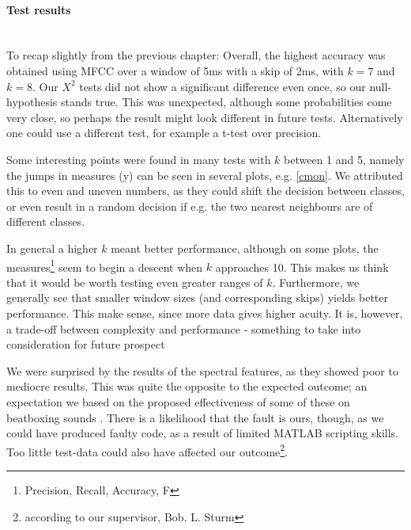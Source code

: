 \paragraph{Test results} \hspace{0pt} \\
To recap slightly from the previous chapter: Overall, the highest accuracy was obtained using MFCC over a window of 5ms with a skip of 2ms, with $k=7$ and $k=8$. Our $X^2$ tests did not show a significant difference even once, so our null-hypothesis stands true. This was unexpected, although some probabilities come very close, so perhaps the result might look different in future tests. Alternatively one could use a different test, for example a t-test over precision.

Some interesting points were found in many tests with $k$ between 1 and 5, namely the jumps in measures (y) can be seen in several plots, e.g. \ref{cmon}. We attributed this to even and uneven numbers, as they could shift the decision between classes, or even result in a random decision if e.g. the two nearest neighbours are of different classes.

In general a higher $k$ meant better performance, although on some plots, the measures\footnote{Precision, Recall, Accuracy, F} seem to begin a descent when $k$ approaches 10. This makes us think that it would be worth testing even greater ranges of $k$. 
Furthermore, we generally see that smaller window sizes (and corresponding skips) yields better performance. This make sense, since more data gives higher acuity. It is, however, a trade-off between complexity and performance - something to take into consideration for future prospect

We were surprised by the results of the spectral features, as they showed poor to mediocre results. This was quite the opposite to the expected outcome; an expectation we based on the proposed effectiveness of some of these on beatboxing sounds \citep{Sinyor05}. There is a likelihood that the fault is ours, though, as we could have produced faulty code, as a result of limited MATLAB scripting skills. Too little test-data could also have affected our outcome\footnote{according to our supervisor, Bob. L. Sturm}.


